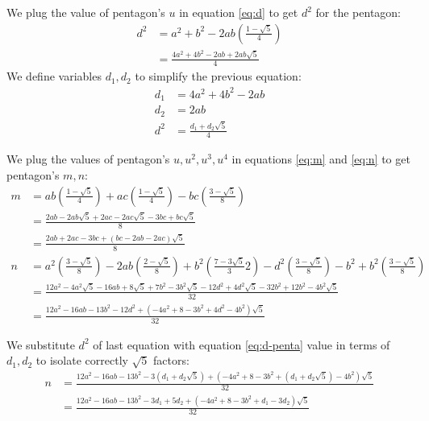 \documentclass[11pt]{article}
\begin{document}
We plug the value of pentagon's $u$ in equation \ref{eq:d} to get $d^2$ for the pentagon:
\begin{align}
d^2 &= a^2 + b^2 - 2ab\left(\frac{1-\sqrt{5}}{4}\right)\nonumber\\
 &= \frac{4a^2 + 4b^2 - 2ab + 2ab\sqrt{5}}{4}
\end{align}
We define variables $d_1,d_2$ to simplify the previous equation:
\begin{align}
d_1 &= 4a^2 + 4b^2 - 2ab\\
d_2 &= 2ab\\
d^2 &= \frac{d_1 + d_2\sqrt5}4 \label{eq:d-penta}
\end{align}


We plug the values of pentagon's $u,u^2,u^3,u^4$ in equations \ref{eq:m} and \ref{eq:n}
to get pentagon's $m,n$:
\begin{align}
m &= ab\left(\frac{1-\sqrt5}4\right)
 + ac\left(\frac{1-\sqrt5}4\right)
 - bc\left(\frac{3-\sqrt5}8\right)\nonumber\\
 &= \frac{2ab - 2ab\sqrt5 + 2ac - 2ac\sqrt5 - 3bc + bc\sqrt5}8\nonumber\\
 &= \frac{2ab + 2ac - 3bc + (bc -2ab - 2ac)\sqrt5}8\\
%
n &= a^2\left(\frac{3-\sqrt5}8\right)
 - 2ab\left(\frac{2-\sqrt5}8\right)
 + b^2\left(\frac{7-3\sqrt5}32\right)
 - d^2\left(\frac{3-\sqrt5}8\right)
 - b^2
 + b^2\left(\frac{3-\sqrt5}8\right)\nonumber\\
 &= \frac{
 12a^2 - 4a^2\sqrt5 -16ab+8\sqrt5 +7b^2-3b^2\sqrt5 -12d^2+4d^2\sqrt5 -32b^2
 +12b^2-4b^2\sqrt5
 }{32}\nonumber\\
 &= \frac{12a^2 - 16ab - 13b^2 - 12d^2 + (-4a^2 + 8 - 3b^2 + 4d^2 - 4b^2)\sqrt5}{32}
\end{align}

We substitute $d^2$ of last equation with equation \ref{eq:d-penta} value in terms of $d_1,d_2$
to isolate correctly $\sqrt5$ factors:
\begin{align}
n &= \frac{
 12a^2 - 16ab - 13b^2 - 3(d_1 + d_2\sqrt5)
 + (-4a^2 + 8 - 3b^2 + (d_1 + d_2\sqrt5) - 4b^2)\sqrt5
}{32} \nonumber\\
 &= \frac{
 12a^2 - 16ab - 13b^2 - 3d_1 + 5d_2
 + (-4a^2 + 8 - 3b^2 + d_1 - 3d_2)\sqrt5
 }{32}
\end{align}
\end{document}
